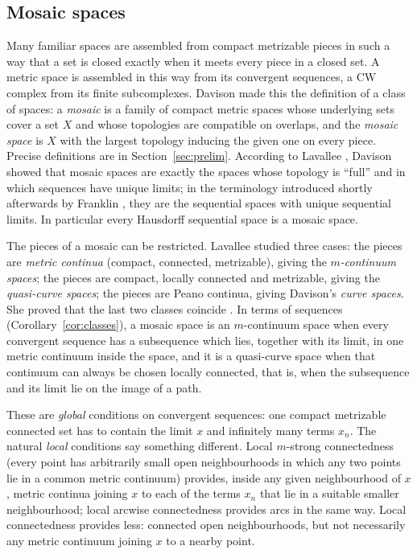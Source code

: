 \documentclass[11pt]{amsart}
\theoremstyle{definition}
\theoremstyle{remark}
\numberwithin{equation}{section}
\begin{document}
\subsection{Mosaic spaces}
Many familiar spaces are assembled from compact metrizable pieces in such a way that a set is closed exactly when it meets every piece in a closed set. A metric space is assembled in this way from its convergent sequences, a CW complex from its finite subcomplexes. Davison \cite{davison59} made this the definition of a class of spaces: a \emph{mosaic} is a family of compact metric spaces whose underlying sets cover a set $X$ and whose topologies are compatible on overlaps, and the \emph{mosaic space} is $X$ with the largest topology inducing the given one on every piece. Precise definitions are in Section~\ref{sec:prelim}. According to Lavallee \cite[Theorem~1.6]{lavallee64}, Davison showed that mosaic spaces are exactly the spaces whose topology is ``full'' and in which sequences have unique limits; in the terminology introduced shortly afterwards by Franklin \cite{franklin65}, they are the sequential spaces with unique sequential limits. In particular every Hausdorff sequential space is a mosaic space.

The pieces of a mosaic can be restricted. Lavallee \cite{lavallee64} studied three cases: the pieces are \emph{metric continua} (compact, connected, metrizable), giving the \emph{$m$-continuum spaces}; the pieces are compact, locally connected and metrizable, giving the \emph{quasi-curve spaces}; the pieces are Peano continua, giving Davison's \emph{curve spaces}. She proved that the last two classes coincide \cite[Theorem~6.1]{lavallee64}. In terms of sequences (Corollary~\ref{cor:classes}), a mosaic space is an $m$-continuum space when every convergent sequence has a subsequence which lies, together with its limit, in one metric continuum inside the space, and it is a quasi-curve space when that continuum can always be chosen locally connected, that is, when the subsequence and its limit lie on the image of a path.

These are \emph{global} conditions on convergent sequences: one compact metrizable connected set has to contain the limit $x$ and infinitely many terms $x_n$. The natural \emph{local} conditions say something different. Local $m$-strong connectedness (every point has arbitrarily small open neighbourhoods in which any two points lie in a common metric continuum) provides, inside any given neighbourhood of $x$, metric continua joining $x$ to each of the terms $x_n$ that lie in a suitable smaller neighbourhood; local arcwise connectedness provides arcs in the same way. Local connectedness provides less: connected open neighbourhoods, but not necessarily any metric continuum joining $x$ to a nearby point.
\end{document}
